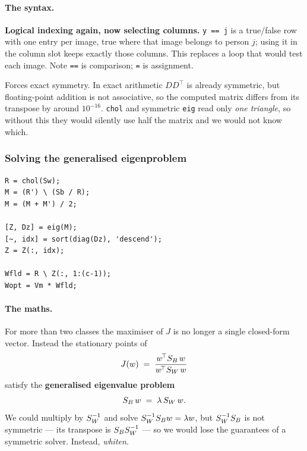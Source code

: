\paragraph{The syntax.}
\begin{description}[leftmargin=*,style=nextline,nosep]
\item[\texttt{Al(:, y == j)}] \textbf{Logical indexing again, now selecting
  columns.} \texttt{y == j} is a true/false row with one entry per image, true
  where that image belongs to person $j$; using it in the column slot keeps
  exactly those columns. This replaces a loop that would test each image.
  Note \texttt{==} is comparison; \texttt{=} is assignment.
\item[\texttt{(Sw + Sw')/2}] Forces exact symmetry. In exact arithmetic
  $D D^{\!\top}$ is already symmetric, but floating-point addition is not
  associative, so the computed matrix differs from its transpose by around
  $10^{-16}$. \texttt{chol} and symmetric \texttt{eig} read only \emph{one
  triangle}, so without this they would silently use half the matrix and we
  would not know which.
\end{description}

\subsubsection{Solving the generalised eigenproblem}

\begin{lstlisting}
R = chol(Sw);
M = (R') \ (Sb / R);
M = (M + M') / 2;

[Z, Dz] = eig(M);
[~, idx] = sort(diag(Dz), 'descend');
Z = Z(:, idx);

Wfld = R \ Z(:, 1:(c-1));
Wopt = Vm * Wfld;
\end{lstlisting}

\paragraph{The maths.} For more than two classes the maximiser of $J$ is no
longer a single closed-form vector. Instead the stationary points of
\[
  J(w) \;=\; \frac{w^{\!\top}S_B\,w}{w^{\!\top}S_W\,w}
\]
satisfy the \textbf{generalised eigenvalue problem}
\[
  S_B\,w \;=\; \lambda\,S_W\,w .
\]
We could multiply by $S_W^{-1}$ and solve $S_W^{-1}S_B w = \lambda w$, but
$S_W^{-1}S_B$ is not symmetric --- its transpose is $S_BS_W^{-1}$ --- so we
would lose the guarantees of a symmetric solver. Instead, \emph{whiten}.

